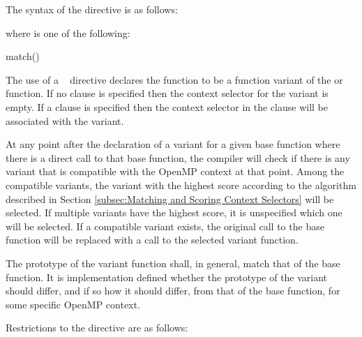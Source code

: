 \begin{fortranspecific}
The syntax of the  directive is as follows:


where  is one of the following{}:

\begin{indentedcodelist}
match()
\end{indentedcodelist}
\end{fortranspecific}

\descr

The use of a ~ directive declares the function to
be a function variant of the  or 
function. If no  clause is specified then the context selector for
the variant is empty. If a  clause is specified then the context
selector in the clause will be associated with the variant.

At any point after the declaration of a variant for a given base function
where there is a direct call to that base function, the compiler will check if
there is any variant that is compatible with the OpenMP context at that point.
Among the compatible variants, the variant with the highest score according to
the algorithm described in Section \ref{subsec:Matching and Scoring Context
Selectors} will be selected. If multiple variants have the highest score, it
is unspecified which one will be selected. If a compatible variant exists, the
original call to the base function will be replaced with a call to the
selected variant function.

The prototype of the variant function shall, in general, match that of the
base function. It is implementation defined whether the prototype of the
variant should differ, and if so how it should differ, from that of the
base function, for some specific OpenMP context.

\restrictions
Restrictions to the  directive are as follows:


